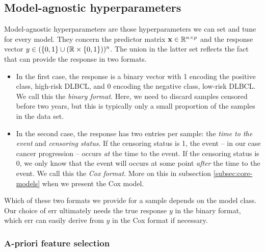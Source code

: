 \subsection{Model-agnostic hyperparameters}\label{subsec:model-agnostic}

Model-agnostic hyperparameters are those hyperparameters we can set and tune for every model. They 
concern the predictor matrix $\mathbf{x} \in \mathbb{R}^{n \times p}$ and the response vector $y \in 
(\{0, 1\} \cup (\mathbb{R} \times \{ 0, 1 \}))^n$. The union in the latter set reflects the fact that 
can provide the response in two formats. 
\begin{itemize}
    \item In the first case, the response is a binary vector with 1 encoding the positive class, 
        high-risk DLBCL, and 0 encoding the negative class, low-risk DLBCL. We call this the 
        \textit{binary format}. Here, we need to discard samples censored before two years, but this 
        is typically only a small proportion of the samples in the data set. 
    \item In the second case, the response has two entries per sample: the \textit{time to the 
        event} and \textit{censoring status}. If the censoring status is 1, the event -- in our case 
        cancer progression -- occurs \textit{at} the time to the event. If the censoring status is 
        0, 
        we only know that the event will occurs at some point \textit{after} the time to the event.
        We call this the \textit{Cox format}. More on this in subsection \ref{subsec:core-models} 
        when we present the Cox model. 
\end{itemize}

Which of these two formats we provide for a sample 
depends on the model class. Our choice of $\text{err}$ ultimately needs the true response $y$ in 
the binary format, which $\text{err}$ can easily derive from $y$ in the Cox format if necessary.

\subsubsection{A-priori feature selection}


